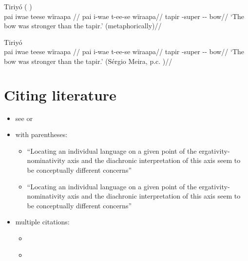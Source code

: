 \documentclass{article}
\begin{document}
\ex  Tiriyó (\cite[420]{triomeira1999}
) \\\label{tri-1}
\begingl \glpreamble pai iwae teese wïraapa //
\gla pai i-wae t-ee-se wïraapa//
\glb tapir -super -- bow//
\glft ‘The bow was stronger than the tapir.’ (metaphorically)//
\endgl
\xe

\ex  Tiriyó  \\\label{tri-1}
\begingl \glpreamble pai iwae teese wïraapa //
\gla pai i-wae t-ee-se wïraapa//
\glb tapir -super -- bow//
\glft ‘The bow was stronger than the tapir.’ (Sérgio Meira, p.c.
)//
\endgl
\xe

\section{\texorpdfstring{Citing literature
\label{sec:sources}}{Citing literature }}

\begin{itemize}
\tightlist
\item
  see \textcites{alvarez1998split} or
  \textcites[133-134]{alvarez1998split}
\item
  with parentheses:

  \begin{itemize}
  \tightlist
  \item
    ``Locating an individual language on a given point of the
    ergativity-nominativity axis and the diachronic interpretation of
    this axis seem to be conceptually different concerns''
    \parencites{alvarez1998split}
  \item
    ``Locating an individual language on a given point of the
    ergativity-nominativity axis and the diachronic interpretation of
    this axis seem to be conceptually different concerns''
    \parencites[71]{alvarez1998split}
  \end{itemize}
\item
  multiple citations:

  \begin{itemize}
  \tightlist
  \item
    \textcites[133-134]{alvarez1998split}[218]{triomeira1999}
  \item
    \parencites[133-134]{alvarez1998split}[218]{triomeira1999}
  \end{itemize}
\end{itemize}

\printbibliography
\end{document}
